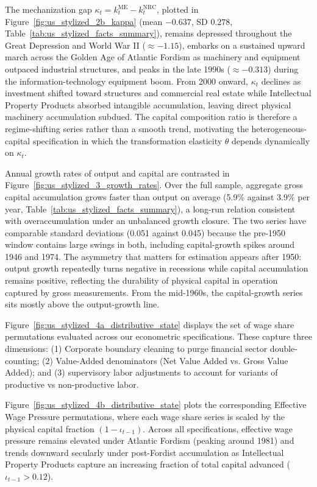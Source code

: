 The mechanization gap $\kappa_t = k_t^{\text{ME}} - k_t^{\text{NRC}}$, plotted in Figure~\ref{fig:us_stylized_2b_kappa} (mean $-0.637$, SD $0.278$, Table~\ref{tab:us_stylized_facts_summary}), remains depressed throughout the Great Depression and World War II ($\approx -1.15$), embarks on a sustained upward march across the Golden Age of Atlantic Fordism as machinery and equipment outpaced industrial structures, and peaks in the late 1990s ($\approx -0.313$) during the information-technology equipment boom. From 2000 onward, $\kappa_t$ declines as investment shifted toward structures and commercial real estate while Intellectual Property Products absorbed intangible accumulation, leaving direct physical machinery accumulation subdued. The capital composition ratio is therefore a regime-shifting series rather than a smooth trend, motivating the heterogeneous-capital specification in which the transformation elasticity $\theta$ depends dynamically on $\kappa_t$.

Annual growth rates of output and capital are contrasted in Figure~\ref{fig:us_stylized_3_growth_rates}. Over the full sample, aggregate gross capital accumulation grows faster than output on average (5.9\% against 3.9\% per year, Table~\ref{tab:us_stylized_facts_summary}), a long-run relation consistent with overaccumulation under an unbalanced growth closure. The two series have comparable standard deviations (0.051 against 0.045) because the pre-1950 window contains large swings in both, including capital-growth spikes around 1946 and 1974. The asymmetry that matters for estimation appears after 1950: output growth repeatedly turns negative in recessions while capital accumulation remains positive, reflecting the durability of physical capital in operation captured by gross measurements. From the mid-1960s, the capital-growth series sits mostly above the output-growth line.

Figure~\ref{fig:us_stylized_4a_distributive_state} displays the set of wage share permutations evaluated across our econometric specifications. These capture three dimensions: (1) Corporate boundary cleaning to purge financial sector double-counting; (2) Value-Added denominators (Net Value Added vs. Gross Value Added); and (3) \citet{ShaikhTonak1994} supervisory labor adjustments to account for variants of productive vs non-productive labor. 

Figure~\ref{fig:us_stylized_4b_distributive_state} plots the corresponding Effective Wage Pressure permutations, where each wage share series is scaled by the physical capital fraction $(1 - \iota_{t-1})$. Across all specifications, effective wage pressure remains elevated under Atlantic Fordism (peaking around 1981) and trends downward secularly under post-Fordist accumulation as Intellectual Property Products capture an increasing fraction of total capital advanced ($\iota_{t-1} > 0.12$).

